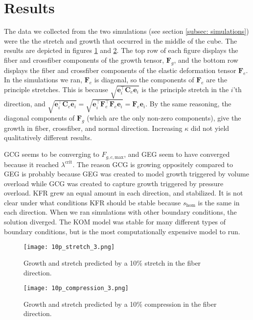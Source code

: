 \section{Results}
The data we collected from the two simulations (see section \ref{subsec: simulations}) were the the stretch and growth that occurred in the middle of the cube. The results are depicted in figures \ref{fig:10p_stretch} and \ref{fig:10p_compression}. The top row of each figure displays the fiber and crossfiber components of the growth tensor, $\mathbf{F}_g$, and the bottom row displays the fiber and crossfiber components of the elastic deformation tensor $\mathbf{F}_e$. In the simulations we ran, $\mathbf{F}_e$ is diagonal, so the components of $\mathbf{F}_e$ are the principle stretches. This is because $\sqrt{\mathbf{e}_i^\top\mathbf{C}_e\mathbf{e}_i}$ is the principle stretch in the $i$'th direction, and $\sqrt{\mathbf{e}_i^\top\mathbf{C}_e\mathbf{e}_i} = \sqrt{\mathbf{e}_i^\top\mathbf{F}_e^\top\mathbf{F}_e\mathbf{e}_i} = \mathbf{F}_e\mathbf{e}_i$. By the same reasoning, the diagonal components of $\mathbf{F}_g$ (which are the only non-zero components), give the growth in fiber, crossfiber, and normal direction. Increasing $\kappa$ did not yield qualitatively different results. \par
GCG seems to be converging to $F_{g,c,\mathrm{max}}$, and GEG seem to have converged because it reached $\lambda^\text{crit}$. The reason GCG is growing oppositely compared to GEG is probably because GEG was created to model growth triggered by volume overload while GCG was created to capture growth triggered by pressure overload. KFR grew an equal amount in each direction, and stabilized. It is not clear under what conditions KFR should be stable because $s_\mathrm{hom}$ is the same in each direction. When we ran simulations with other boundary conditions, the solution diverged. The KOM model was stable for many different types of boundary conditions, but is the most computationally expensive model to run.\par 
\begin{figure}[h]
    \centering
    \texttt{[image: 10p\_stretch\_3.png]}
    \caption{Growth and stretch predicted by a 10\% stretch in the fiber direction.}
    \label{fig:10p_stretch}
\end{figure}
\begin{figure}[h]
    \centering
    \texttt{[image: 10p\_compression\_3.png]}
    \caption{Growth and stretch predicted by a 10\% compression in the fiber direction.}
    \label{fig:10p_compression}
\end{figure}    
